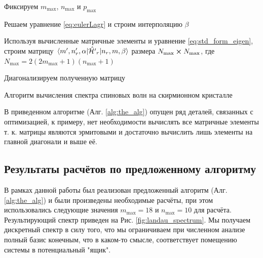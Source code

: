 \documentclass[a4paper,article,14pt]{extarticle}
\begin{document}
\begin{algorithm}[ht]
 \SetAlgoLined
 Фиксируем $m_\text{max}$, $n_\text{max}$ и $p_\text{max}$

Решаем уравнение \eqref{eq:eulerLagr} и строим интерполяцию $\beta$

Используя вычисленные матричные элементы и уравнение \eqref{eq:std_form_eigen}, строим матрицу $\mel{m', n'_r, \alpha}{\hat {\cal H'}_{r}}{n_r,m, \beta}$ размера $N_\text{max} \cross N_\text{max}$, где  $N_\text{max}=2 (2 m_\text{max} + 1) (n_\text{max} + 1)$

Диагонализируем полученную матрицу 

\caption{Алгоритм вычисления спектра спиновых волн на скирмионном кристалле}\label{alg:the_alg}
\end{algorithm}

В приведенном алгоритме (Алг. \ref{alg:the_alg}) опущен ряд деталей, связанных с оптимизацией, к примеру, нет необходимости вычислять все матричные элементы т. к. матрицы являются эрмитовыми и достаточно вычислить лишь элементы на главной диагонали и выше её.

\pagebreak
\subsection{Результаты расчётов по предложенному алгоритму}

В рамках данной работы был реализован предложенный алгоритм (Алг. \ref{alg:the_alg}) и были произведены необходимые расчёты, при этом использовались следующие значения $m_\text{max}=18$ и $n_\text{max}=10$ для расчёта. Результирующий спектр приведен на Рис.  \ref{fig:landau_spectrum}. Мы получаем дискретный спектр в силу того, что мы ограничиваем при численном анализе полный базис конечным, что в каком-то смысле, соответствует помещению системы в потенциальный "ящик".
\end{document}
